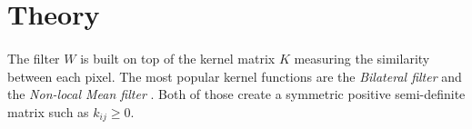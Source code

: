 \section{Theory}

\paragraph{}
The filter $W$ is built on top of the kernel matrix $K$ measuring the similarity between each pixel.
The most popular kernel functions are the \textit{Bilateral filter} \cite{bilateral_tomasi_1998} and the \textit{Non-local Mean filter} \cite{kervrann_nlm_2006}.
Both of those create a symmetric positive semi-definite matrix such as $k_{ij} \ge 0$.
